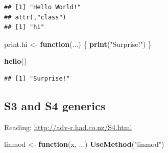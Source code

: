 \documentclass[]{book}
\newenvironment{Shaded}{\begin{snugshade}}{\end{snugshade}}
\newcommand{\KeywordTok}[1]{\textcolor[rgb]{0.13,0.29,0.53}{\textbf{#1}}}
\newcommand{\StringTok}[1]{\textcolor[rgb]{0.31,0.60,0.02}{#1}}
\newcommand{\ControlFlowTok}[1]{\textcolor[rgb]{0.13,0.29,0.53}{\textbf{#1}}}
\newcommand{\OperatorTok}[1]{\textcolor[rgb]{0.81,0.36,0.00}{\textbf{#1}}}
\newcommand{\NormalTok}[1]{#1}
\theoremstyle{definition}
\theoremstyle{definition}
\theoremstyle{definition}
\theoremstyle{remark}
\begin{document}
\begin{verbatim}
## [1] "Hello World!"
## attr(,"class")
## [1] "hi"
\end{verbatim}

\begin{Shaded}
\begin{Highlighting}[]
\NormalTok{print.hi <-}\StringTok{ }\ControlFlowTok{function}\NormalTok{(...) \{}
  \KeywordTok{print}\NormalTok{(}\StringTok{"Surprise!"}\NormalTok{)}
\NormalTok{\}}

\KeywordTok{hello}\NormalTok{()}
\end{Highlighting}
\end{Shaded}

\begin{verbatim}
## [1] "Surprise!"
\end{verbatim}

\subsection{S3 and S4 generics}\label{s3-and-s4-generics}

Reading: \url{http://adv-r.had.co.nz/S4.html}

\begin{Shaded}
\begin{Highlighting}[]
\NormalTok{linmod <-}\StringTok{ }\ControlFlowTok{function}\NormalTok{(x, ...)}
  \KeywordTok{UseMethod}\NormalTok{(}\StringTok{"linmod"}\NormalTok{)}
\end{Highlighting}
\end{Shaded}

\begin{Shaded}
\end{Shaded}
\end{document}
